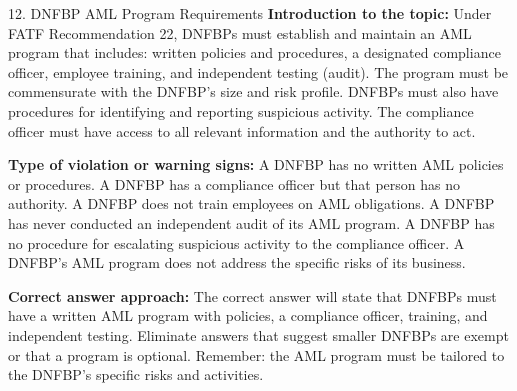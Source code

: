 \documentclass[11pt,a4paper]{beamer}
\begin{document}
\begin{frame}{12. DNFBP AML Program Requirements}
\tiny
\noindent\textbf{Introduction to the topic:} Under FATF Recommendation 22, DNFBPs must establish and maintain an AML program that includes: written policies and procedures, a designated compliance officer, employee training, and independent testing (audit). The program must be commensurate with the DNFBP's size and risk profile. DNFBPs must also have procedures for identifying and reporting suspicious activity. The compliance officer must have access to all relevant information and the authority to act.

\vspace{0.1cm}
\noindent\textbf{Type of violation or warning signs:} A DNFBP has no written AML policies or procedures. A DNFBP has a compliance officer but that person has no authority. A DNFBP does not train employees on AML obligations. A DNFBP has never conducted an independent audit of its AML program. A DNFBP has no procedure for escalating suspicious activity to the compliance officer. A DNFBP's AML program does not address the specific risks of its business.

\vspace{0.1cm}
\noindent\textbf{Correct answer approach:} The correct answer will state that DNFBPs must have a written AML program with policies, a compliance officer, training, and independent testing. Eliminate answers that suggest smaller DNFBPs are exempt or that a program is optional. Remember: the AML program must be tailored to the DNFBP's specific risks and activities.
\end{frame}
\end{document}
